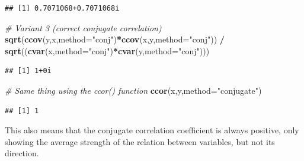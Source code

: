 \documentclass[
]{book}
\newenvironment{Shaded}{\begin{snugshade}}{\end{snugshade}}
\newcommand{\CommentTok}[1]{\textcolor[rgb]{0.56,0.35,0.01}{\textit{#1}}}
\newcommand{\DataTypeTok}[1]{\textcolor[rgb]{0.13,0.29,0.53}{#1}}
\newcommand{\KeywordTok}[1]{\textcolor[rgb]{0.13,0.29,0.53}{\textbf{#1}}}
\newcommand{\NormalTok}[1]{#1}
\newcommand{\OperatorTok}[1]{\textcolor[rgb]{0.81,0.36,0.00}{\textbf{#1}}}
\newcommand{\StringTok}[1]{\textcolor[rgb]{0.31,0.60,0.02}{#1}}
\begin{document}
\begin{verbatim}
## [1] 0.7071068+0.7071068i
\end{verbatim}

\begin{Shaded}
\begin{Highlighting}[]
\CommentTok{\# Variant 3 (correct conjugate correlation)}
\KeywordTok{sqrt}\NormalTok{(}\KeywordTok{ccov}\NormalTok{(y,x,}\DataTypeTok{method=}\StringTok{"conj"}\NormalTok{)}\OperatorTok{*}\KeywordTok{ccov}\NormalTok{(x,y,}\DataTypeTok{method=}\StringTok{"conj"}\NormalTok{)) }\OperatorTok{/}
\StringTok{    }\KeywordTok{sqrt}\NormalTok{((}\KeywordTok{cvar}\NormalTok{(x,}\DataTypeTok{method=}\StringTok{"conj"}\NormalTok{)}\OperatorTok{*}\KeywordTok{cvar}\NormalTok{(y,}\DataTypeTok{method=}\StringTok{"conj"}\NormalTok{)))}
\end{Highlighting}
\end{Shaded}

\begin{verbatim}
## [1] 1+0i
\end{verbatim}

\begin{Shaded}
\begin{Highlighting}[]
\CommentTok{\# Same thing using the ccor() function}
\KeywordTok{ccor}\NormalTok{(x,y,}\DataTypeTok{method=}\StringTok{"conjugate"}\NormalTok{)}
\end{Highlighting}
\end{Shaded}

\begin{verbatim}
## [1] 1
\end{verbatim}

This also means that the conjugate correlation coefficient is always positive, only showing the average strength of the relation between variables, but not its direction.
\end{document}
